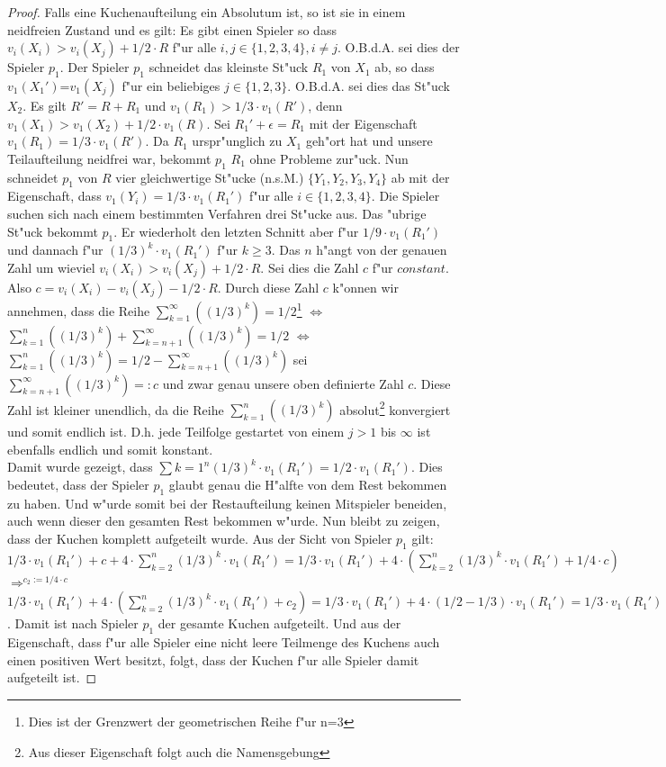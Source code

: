 \documentclass[11pt, a4paper, twoside]{article}
\numberwithin{equation}{section}
\begin{document}
\begin{proof}
Falls eine Kuchenaufteilung ein Absolutum ist, so ist sie in einem neidfreien Zustand und es gilt: Es gibt einen Spieler so dass $v_i(X_i)>v_i(X_j)+1/2\cdot R$ f"ur alle $i,j \in \{1,2,3,4\}, i \neq j$. O.B.d.A. sei dies der Spieler $p_1$. Der Spieler $p_1$ schneidet das kleinste St"uck $R_1$ von $X_1$ ab, so dass $v_1(X_1')$=$v_1(X_j)$ f"ur ein beliebiges $j \in \{1,2,3\}$. O.B.d.A. sei dies das St"uck $X_2$. Es gilt $R'=R+R_1$ und $v_1(R_1)>1/3 \cdot v_1(R')$, denn $v_1(X_1)>v_1(X_2)+1/2\cdot v_1(R)$. Sei $R_1'+\epsilon= R_1$ mit der Eigenschaft $v_1(R_1)=1/3 \cdot v_1(R')$. Da $R_1$ urspr"unglich zu $X_1$ geh"ort hat und unsere Teilaufteilung neidfrei war, bekommt $p_1$ $R_1$ ohne Probleme zur"uck. Nun schneidet $p_1$ von $R$ vier gleichwertige St"ucke (n.s.M.) $\{Y_1,Y_2,Y_3,Y_4\}$ ab mit der Eigenschaft, dass $v_1(Y_i)=1/3 \cdot v_1(R_1')$ f"ur alle $i \in \{1,2,3,4\}$. Die Spieler suchen sich nach einem bestimmten Verfahren drei St"ucke aus. Das "ubrige St"uck bekommt $p_1$. Er wiederholt den letzten Schnitt aber f"ur $1/9 \cdot v_1(R_1')$ und dannach f"ur $(1/3)^k \cdot v_1(R_1')$ f"ur $k \geq 3.$ Das $n$ h"angt von der genauen Zahl um wieviel $v_i(X_i)>v_i(X_j)+1/2\cdot R$. Sei dies die Zahl $c$ f"ur  $constant$. Also $c=v_i(X_i)-v_i(X_j)-1/2\cdot R$. Durch diese Zahl $c$ k"onnen wir annehmen, dass die Reihe $\sum_{k=1}^\infty ((1/3)^k) = 1/2$\footnote[1]{Dies ist der Grenzwert der geometrischen Reihe f"ur n=3} $\iff$ $\sum_{k=1}^n ((1/3)^k) + \sum_{k=n+1}^\infty((1/3)^k)=1/2$ $\iff$ $\sum_{k=1}^n ((1/3)^k) = 1/2 - \sum_{k=n+1}^\infty((1/3)^k)$ 
sei $\sum_{k=n+1}^\infty((1/3)^k) =:c$ und zwar genau unsere oben definierte Zahl $c$. Diese Zahl ist kleiner unendlich, da die Reihe $\sum_{k=1}^n ((1/3)^k)$ absolut\footnote[2]{Aus dieser Eigenschaft folgt auch die Namensgebung} konvergiert und somit endlich ist. D.h. jede Teilfolge gestartet von einem $j>1$ bis $\infty$ ist ebenfalls endlich und somit konstant.\\
Damit wurde gezeigt, dass $\sum{k=1}^n(1/3)^k \cdot v_1(R_1')=1/2\cdot v_1(R_1')$. Dies bedeutet, dass der Spieler $p_1$ glaubt genau die H"alfte von dem Rest bekommen zu haben. Und w"urde somit bei der Restaufteilung keinen Mitspieler beneiden, auch wenn dieser den gesamten Rest bekommen w"urde. Nun bleibt zu zeigen, dass der Kuchen komplett aufgeteilt wurde. Aus der Sicht von Spieler $p_1$ gilt:\\
$1/3\cdot v_1(R_1')+c+4\cdot \sum_{k=2}^n(1/3)^k \cdot v_1(R_1')=1/3\cdot v_1(R_1')+4\cdot (\sum_{k=2}^n(1/3)^k \cdot v_1(R_1') +1/4 \cdot c)$$\Rightarrow^{c_2:= 1/4 \cdot c}$ $1/3\cdot v_1(R_1')+4\cdot ( \sum_{k=2}^n(1/3)^k \cdot v_1(R_1') + c_2)= 1/3\cdot v_1(R_1')+4 \cdot (1/2-1/3)\cdot v_1(R_1')= 1/3\cdot v_1(R_1') + 4/6\cdot v_1(R_1') = v_1(R_1')$. Damit ist nach Spieler $p_1$ der gesamte Kuchen aufgeteilt. Und aus der Eigenschaft, dass f"ur alle Spieler eine nicht leere Teilmenge des Kuchens auch einen positiven Wert besitzt, folgt, dass der Kuchen f"ur alle Spieler damit aufgeteilt ist.
\end{proof}
\end{document}
